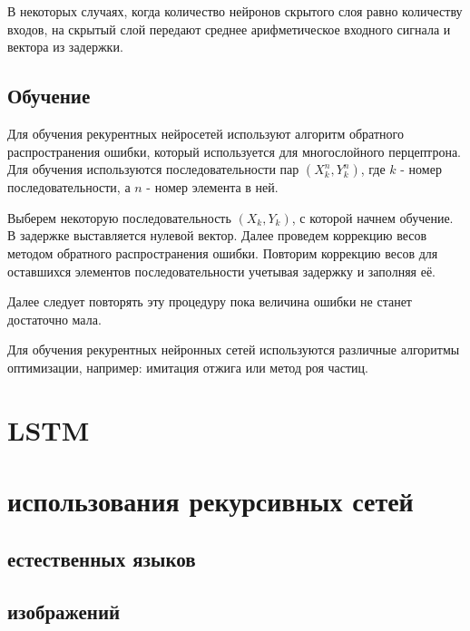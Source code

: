 \documentclass[14pt]{article}
\begin{document}
В некоторых случаях, когда количество нейронов скрытого слоя равно количеству входов, на скрытый слой передают среднее арифметическое входного сигнала и вектора из задержки.
\subsection{Обучение}
Для обучения рекурентных нейросетей используют алгоритм обратного распространения ошибки, который используется для многослойного перцептрона. Для обучения используются последовательности пар $(X_k^n, Y_k^n)$, где $k$ - номер последовательности, а $n$ - номер элемента в ней.


Выберем некоторую последовательность $(X_k, Y_k)$, с которой начнем обучение. В задержке выставляется нулевой вектор. Далее проведем коррекцию весов методом обратного распространения ошибки. Повторим коррекцию весов для оставшихся элементов последовательности учетывая задержку и заполняя её.


Далее следует повторять эту процедуру пока величина ошибки не станет достаточно мала.


Для обучения рекурентных нейронных сетей используются различные алгоритмы оптимизации, например: имитация отжига или метод роя частиц.

\section{\huge LSTM}

\subsection{}

\subsection{}

\subsection{}


\section{ использования рекурсивных сетей}

\subsection{ естественных языков}

\subsection{ изображений}


\section{}
\end{document}
